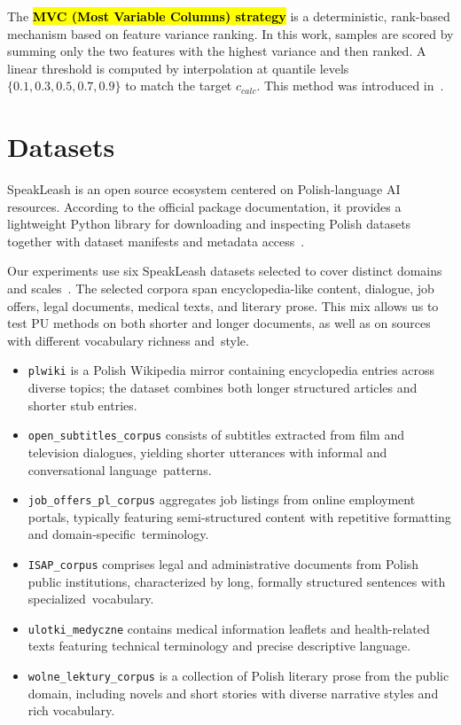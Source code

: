 \documentclass[applsci,article,accept,pdftex,moreauthors]{Definitions/mdpi}
\newcommand{\rev}[1]{{#1}}
\begin{document}
The \textbf{\hl{MVC (Most Variable Columns) strategy}} is a deterministic, rank-based mechanism based on feature variance ranking. In this work, samples are scored by summing only the two features with the highest variance and then ranked. A linear threshold is computed by interpolation at quantile levels $\{0.1, 0.3, 0.5, 0.7, 0.9\}$ to match the target $c_{calc}$. This method was introduced in~\cite{mdai25_mvc}.



\section{Datasets}
SpeakLeash is an open source ecosystem centered on Polish-language AI resources. According to the official package documentation, it provides a lightweight Python library for downloading and inspecting Polish datasets together with dataset manifests and metadata access~\cite{speakleash}.

\rev{Our experiments use six SpeakLeash datasets selected to cover distinct domains and scales~\cite{speakleash}. The selected corpora span encyclopedia-like content, dialogue, job offers, legal documents, medical texts, and literary prose. This mix allows us to test PU methods on both shorter and longer documents, as well as on sources with different vocabulary richness \mbox{and style.}}

\begin{itemize}
\item \texttt{plwiki} is a Polish Wikipedia mirror containing encyclopedia entries across diverse topics; the dataset combines both longer structured articles and shorter stub entries.
\item \texttt{open\_subtitles\_corpus} consists of subtitles extracted from film and television dialogues, yielding shorter utterances with informal and conversational \mbox{language patterns.}
\item \texttt{job\_offers\_pl\_corpus} aggregates job listings from online employment portals, typically featuring semi-structured content with repetitive formatting and domain-\mbox{specific~terminology.}
\item \texttt{ISAP\_corpus} comprises legal and administrative documents from Polish public institutions, characterized by long, formally structured sentences with \mbox{specialized vocabulary.}
\item \texttt{ulotki\_medyczne} contains medical information leaflets and health-related texts featuring technical terminology and precise descriptive language.
\item \texttt{wolne\_lektury\_corpus} is a collection of Polish literary prose from the public domain, including novels and short stories with diverse narrative styles and rich vocabulary.
\end{itemize}
\end{document}

